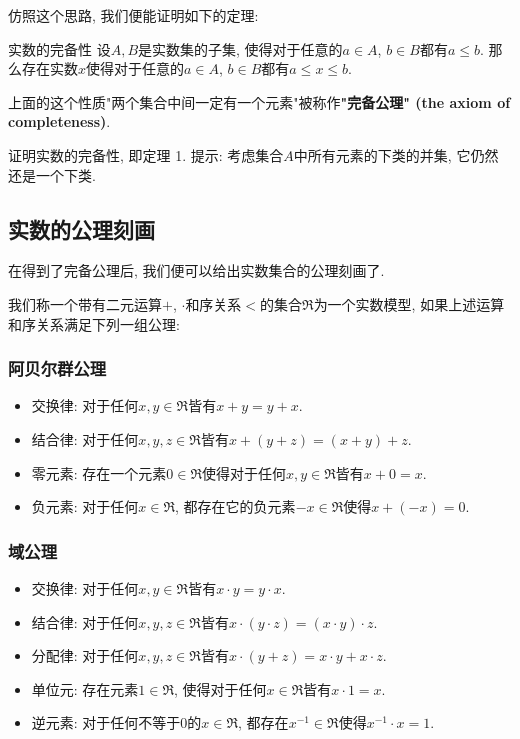 仿照这个思路, 我们便能证明如下的定理:

\begin{theorem}{实数的完备性}\label{Cmplt_the1}
设$A,B$是实数集的子集, 使得对于任意的$a\in A$, $b\in B$都有$a\leq b$. 那么存在实数$x$使得对于任意的$a\in A$, $b\in B$都有$a\leq x\leq b$.
\end{theorem}

上面的这个性质"两个集合中间一定有一个元素"被称作\textbf{"完备公理" (the axiom of completeness)}.

\begin{exercise}{}
证明实数的完备性, 即定理 1. 提示: 考虑集合$A$中所有元素的下类的并集, 它仍然还是一个下类.
\end{exercise}

\subsection{实数的公理刻画}

在得到了完备公理后, 我们便可以给出实数集合的公理刻画了. 

我们称一个带有二元运算$+$, $\cdot$和序关系$<$的集合$\mathfrak{R}$为一个实数模型, 如果上述运算和序关系满足下列一组公理:

\subsubsection{阿贝尔群公理}
\begin{itemize}
\item 交换律: 对于任何$x,y\in\mathfrak{R}$皆有$x+y=y+x$.
\item 结合律: 对于任何$x,y,z\in\mathfrak{R}$皆有$x+(y+z)=(x+y)+z$.
\item 零元素: 存在一个元素$0\in \mathfrak{R}$使得对于任何$x,y\in\mathfrak{R}$皆有$x+0=x$.
\item 负元素: 对于任何$x\in\mathfrak{R}$, 都存在它的负元素$-x\in\mathfrak{R}$使得$x+(-x)=0$.
\end{itemize}

\subsubsection{域公理}
\begin{itemize}
\item 交换律: 对于任何$x,y\in\mathfrak{R}$皆有$x\cdot y=y\cdot x$.
\item 结合律: 对于任何$x,y,z\in\mathfrak{R}$皆有$x\cdot (y\cdot z)=(x\cdot y)\cdot z$.
\item 分配律: 对于任何$x,y,z\in\mathfrak{R}$皆有$x\cdot (y+z)=x\cdot y+x\cdot z$.
\item 单位元: 存在元素$1\in\mathfrak{R}$, 使得对于任何$x\in\mathfrak{R}$皆有$x\cdot 1=x$.
\item 逆元素: 对于任何不等于0的$x\in\mathfrak{R}$, 都存在$x^{-1}\in\mathfrak{R}$使得$x^{-1}\cdot x=1$.
\end{itemize}

